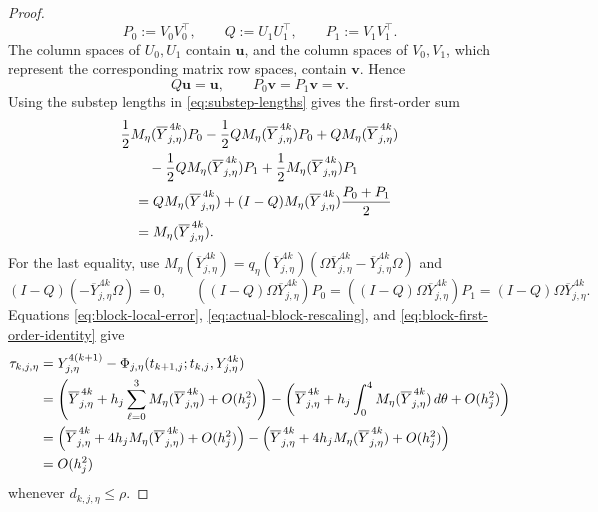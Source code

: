 \documentclass[10pt,a4paper]{amsart}
\numberwithin{equation}{section}
\begin{document}
\begin{proof}
\begin{equation}
 P_0:=V_0V_0^\top,\qquad Q:=U_1U_1^\top,\qquad
 P_1:=V_1V_1^\top.
\end{equation}
The column spaces of $U_0,U_1$ contain $\boldsymbol u$, and the column
spaces of $V_0,V_1$, which represent the corresponding matrix row
spaces, contain $\boldsymbol v$.  Hence
\[
 Q\boldsymbol u=\boldsymbol u,\qquad
 P_0\boldsymbol v=P_1\boldsymbol v=\boldsymbol v.
\]
Using the substep lengths in \eqref{eq:substep-lengths} gives the
first-order sum
\begin{align}
 &\frac12M_\eta(\overline Y_{j,\eta}^{\,4k})P_0
 -\frac12QM_\eta(\overline Y_{j,\eta}^{\,4k})P_0
 +QM_\eta(\overline Y_{j,\eta}^{\,4k})\notag\\
 &\qquad
 -\frac12QM_\eta(\overline Y_{j,\eta}^{\,4k})P_1
 +\frac12M_\eta(\overline Y_{j,\eta}^{\,4k})P_1\notag\\
 &\quad=QM_\eta(\overline Y_{j,\eta}^{\,4k})
 +(I-Q)M_\eta(\overline Y_{j,\eta}^{\,4k})\frac{P_0+P_1}{2}\notag\\
 &\quad=M_\eta(\overline Y_{j,\eta}^{\,4k}).
 \label{eq:block-first-order-identity}
\end{align}
For the last equality, use
$M_\eta(\overline Y_{j,\eta}^{\,4k})
=q_\eta(\overline Y_{j,\eta}^{\,4k})
(\Omega\overline Y_{j,\eta}^{\,4k}
-\overline Y_{j,\eta}^{\,4k}\Omega)$ and
\[
 (I-Q)(-\overline Y_{j,\eta}^{\,4k}\Omega)=0,
 \qquad
 ((I-Q)\Omega\overline Y_{j,\eta}^{\,4k})P_0
 =((I-Q)\Omega\overline Y_{j,\eta}^{\,4k})P_1
 =(I-Q)\Omega\overline Y_{j,\eta}^{\,4k}.
\]
Equations \eqref{eq:block-local-error},
\eqref{eq:actual-block-rescaling}, and
\eqref{eq:block-first-order-identity} give
\begin{align}
 \tau_{k,j,\eta}
 &=Y_{j,\eta}^{4(k+1)}
 -\Phi_{j,\eta}(t_{k+1,j};t_{k,j},Y_{j,\eta}^{4k})\notag\\
 &=\left(
 \overline Y_{j,\eta}^{\,4k}
 +h_j\sum_{\ell=0}^3M_\eta(\overline Y_{j,\eta}^{\,4k})
 +O(h_j^2)\right)
 -\left(
 \overline Y_{j,\eta}^{\,4k}
 +h_j\int_0^4M_\eta(\overline Y_{j,\eta}^{\,4k})\,d\theta
 +O(h_j^2)\right)\notag\\
 &=\left(\overline Y_{j,\eta}^{\,4k}
 +4h_jM_\eta(\overline Y_{j,\eta}^{\,4k})+O(h_j^2)\right)-\left(
 \overline Y_{j,\eta}^{\,4k}
 +4h_jM_\eta(\overline Y_{j,\eta}^{\,4k})+O(h_j^2)\right)\notag\\
 &=O(h_j^2)
 \label{eq:block-error-first-order-cancellation}
\end{align}
whenever \(d_{k,j,\eta}\le\rho\).


\end{proof}
\end{document}
